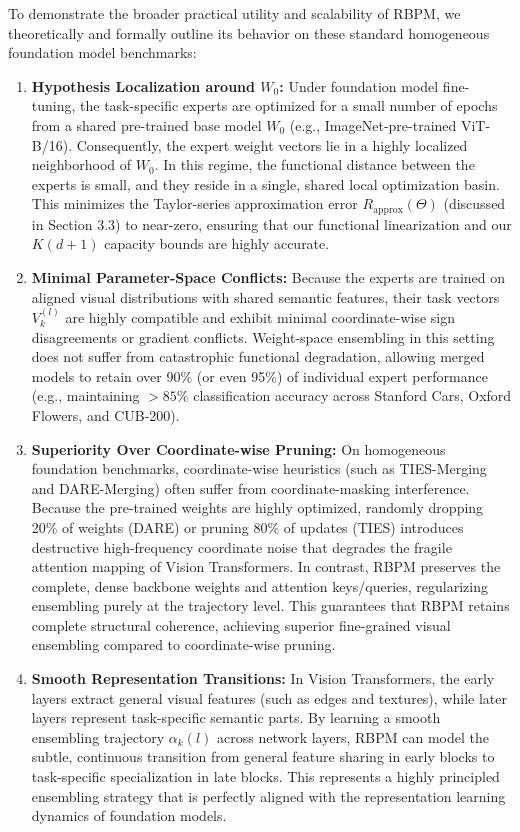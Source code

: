 To demonstrate the broader practical utility and scalability of RBPM, we theoretically and formally outline its behavior on these standard homogeneous foundation model benchmarks:
\begin{enumerate}
    \item \textbf{Hypothesis Localization around $W_0$:} Under foundation model fine-tuning, the task-specific experts are optimized for a small number of epochs from a shared pre-trained base model $W_0$ (e.g., ImageNet-pre-trained ViT-B/16). Consequently, the expert weight vectors lie in a highly localized neighborhood of $W_0$. In this regime, the functional distance between the experts is small, and they reside in a single, shared local optimization basin. This minimizes the Taylor-series approximation error $R_{\text{approx}}(\Theta)$ (discussed in Section 3.3) to near-zero, ensuring that our functional linearization and our $K(d+1)$ capacity bounds are highly accurate.
    \item \textbf{Minimal Parameter-Space Conflicts:} Because the experts are trained on aligned visual distributions with shared semantic features, their task vectors $V_k^{(l)}$ are highly compatible and exhibit minimal coordinate-wise sign disagreements or gradient conflicts. Weight-space ensembling in this setting does not suffer from catastrophic functional degradation, allowing merged models to retain over 90\% (or even 95\%) of individual expert performance (e.g., maintaining $>85\%$ classification accuracy across Stanford Cars, Oxford Flowers, and CUB-200).
    \item \textbf{Superiority Over Coordinate-wise Pruning:} On homogeneous foundation benchmarks, coordinate-wise heuristics (such as TIES-Merging and DARE-Merging) often suffer from coordinate-masking interference. Because the pre-trained weights are highly optimized, randomly dropping 20\% of weights (DARE) or pruning 80\% of updates (TIES) introduces destructive high-frequency coordinate noise that degrades the fragile attention mapping of Vision Transformers. In contrast, RBPM preserves the complete, dense backbone weights and attention keys/queries, regularizing ensembling purely at the trajectory level. This guarantees that RBPM retains complete structural coherence, achieving superior fine-grained visual ensembling compared to coordinate-wise pruning.
    \item \textbf{Smooth Representation Transitions:} In Vision Transformers, the early layers extract general visual features (such as edges and textures), while later layers represent task-specific semantic parts. By learning a smooth ensembling trajectory $\alpha_k(l)$ across network layers, RBPM can model the subtle, continuous transition from general feature sharing in early blocks to task-specific specialization in late blocks. This represents a highly principled ensembling strategy that is perfectly aligned with the representation learning dynamics of foundation models.
\end{enumerate}
